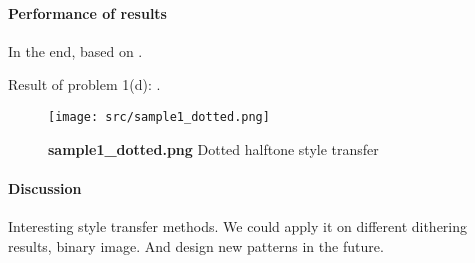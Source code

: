 \paragraph{Performance of results}
In the end, based on .

Result of problem 1(d): .
\begin{figure}
    \centering
    \texttt{[image: src/sample1\_dotted.png]}
    \caption{\textbf{sample1\_dotted.png} Dotted halftone style transfer}
    \label{sample1dotted.png}
\end{figure}

\paragraph{Discussion}
Interesting style transfer methods. We could apply it on different dithering results, binary image.
And design new patterns in the future.

